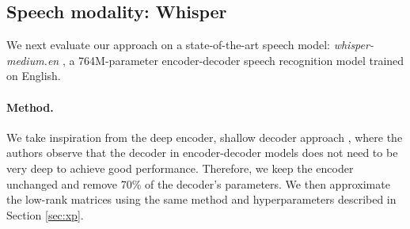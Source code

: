 \begin{table}
    \centering
    \caption{\textbf{Compressing Mamba models saves memory and speeds up computation.} Inference speed was measured on a single A100 GPU, using the whole test split of Wikitext2 with a batch size of 4 and by varying the sequence length from 512 to 16384 tokens. All models were loaded in bf16 and used Flash-Attention2.}
    \label{tab:mem-speed-mamba-ch2}
\end{table}


\subsection{Speech modality: Whisper}

We next evaluate our approach on a state-of-the-art speech model: \textit{whisper-medium.en} \citep{radford2022robustspeechrecognitionlargescale}, a 764M-parameter encoder-decoder speech recognition model trained on English.

\paragraph{Method.} We take inspiration from the deep encoder,
shallow decoder approach \citep{kasai2021deepencodershallowdecoder}, where the
authors observe that the decoder in encoder-decoder models does not need to be very deep to achieve good performance.
Therefore, we keep the encoder unchanged and remove 70\% of the decoder's parameters. We then approximate the low-rank matrices using the same method and hyperparameters described in Section \ref{sec:xp}.
